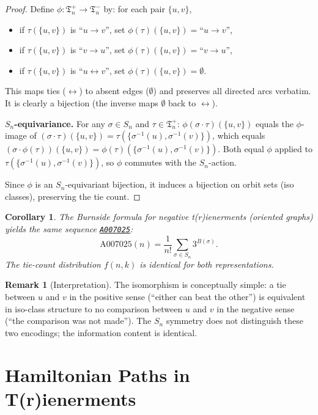 \documentclass[12pt,reqno]{amsart}
\newtheorem{corollary}[theorem]{Corollary}
\theoremstyle{definition}
\newtheorem{remark}[theorem]{Remark}
\theoremstyle{plain}
\newcommand{\OEIS}[1]{\href{https://oeis.org/#1}{\texttt{#1}}}
\begin{document}
\begin{proof}
Define $\phi:\mathfrak{T}_n^+\to\mathfrak{T}_n^-$ by: for each pair $\{u,v\}$,
\begin{itemize}
\item if $\tau(\{u,v\})$ is ``$u\to v$'', set $\phi(\tau)(\{u,v\})=\text{``}u\to v\text{''}$,
\item if $\tau(\{u,v\})$ is ``$v\to u$'', set $\phi(\tau)(\{u,v\})=\text{``}v\to u\text{''}$,
\item if $\tau(\{u,v\})$ is ``$u\leftrightarrow v$'', set $\phi(\tau)(\{u,v\})=\emptyset$.
\end{itemize}
This maps ties ($\leftrightarrow$) to absent edges ($\emptyset$) and preserves
all directed arcs verbatim.  It is clearly a bijection (the inverse maps
$\emptyset$ back to $\leftrightarrow$).

\medskip
\noindent\textbf{$S_n$-equivariance.}
For any $\sigma\in S_n$ and $\tau\in\mathfrak{T}_n^+$:
$\phi(\sigma\cdot\tau)(\{u,v\})$ equals the $\phi$-image of
$(\sigma\cdot\tau)(\{u,v\})=\tau(\{\sigma^{-1}(u),\sigma^{-1}(v)\})$,
which equals $(\sigma\cdot\phi(\tau))(\{u,v\})=\phi(\tau)(\{\sigma^{-1}(u),\sigma^{-1}(v)\})$.
Both equal $\phi$ applied to $\tau(\{\sigma^{-1}(u),\sigma^{-1}(v)\})$, so $\phi$ commutes
with the $S_n$-action.

\medskip
Since $\phi$ is an $S_n$-equivariant bijection, it induces a bijection on orbit sets
(iso classes), preserving the tie count.
\end{proof}

\begin{corollary}
The Burnside formula for negative t(r)ienerments (oriented graphs) yields the same
sequence \OEIS{A007025}:
\[
  \text{A007025}(n)=\frac{1}{n!}\sum_{\sigma\in S_n}3^{B(\sigma)}.
\]
The tie-count distribution $f(n,k)$ is identical for both representations.
\end{corollary}

\begin{remark}[Interpretation]
The isomorphism is conceptually simple: a tie between $u$ and $v$ in the positive
sense (``either can beat the other'') is equivalent in iso-class structure to no
comparison between $u$ and $v$ in the negative sense (``the comparison was not made'').
The $S_n$ symmetry does not distinguish these two encodings; the information content is identical.
\end{remark}

\section{Hamiltonian Paths in T(r)ienerments}
\label{sec:hamiltonian}
\end{document}
